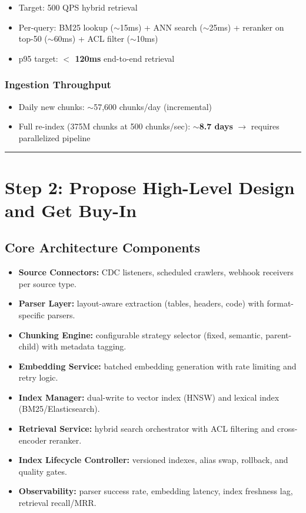 \begin{itemize}
  \item Target: 500 QPS hybrid retrieval
  \item Per-query: BM25 lookup ($\sim$15ms) + ANN search ($\sim$25ms) + reranker on top-50 ($\sim$60ms) + ACL filter ($\sim$10ms)
  \item p95 target: \textbf{$<$ 120ms} end-to-end retrieval
\end{itemize}

\subsubsection*{Ingestion Throughput}

\begin{itemize}
  \item Daily new chunks: $\sim$57,600 chunks/day (incremental)
  \item Full re-index (375M chunks at 500 chunks/sec): \textbf{$\sim$8.7 days} $\rightarrow$ requires parallelized pipeline
\end{itemize}

\bigskip\hrule\bigskip

\section*{Step 2: Propose High-Level Design and Get Buy-In}

\subsection*{Core Architecture Components}

\begin{itemize}
  \item \textbf{Source Connectors:} CDC listeners, scheduled crawlers, webhook receivers per source type.
  \item \textbf{Parser Layer:} layout-aware extraction (tables, headers, code) with format-specific parsers.
  \item \textbf{Chunking Engine:} configurable strategy selector (fixed, semantic, parent-child) with metadata tagging.
  \item \textbf{Embedding Service:} batched embedding generation with rate limiting and retry logic.
  \item \textbf{Index Manager:} dual-write to vector index (HNSW) and lexical index (BM25/Elasticsearch).
  \item \textbf{Retrieval Service:} hybrid search orchestrator with ACL filtering and cross-encoder reranker.
  \item \textbf{Index Lifecycle Controller:} versioned indexes, alias swap, rollback, and quality gates.
  \item \textbf{Observability:} parser success rate, embedding latency, index freshness lag, retrieval recall/MRR.
\end{itemize}

